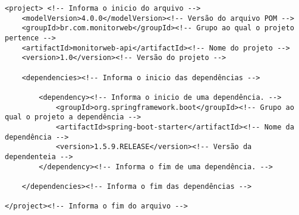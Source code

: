 

\begin{lstlisting}[style=XML,label=Func:ExemploPom,caption={[Exemplo de um arquiv POM.xml.]Exemplo de um arquiv POM.xml.}]
<project> <!-- Informa o inicio do arquivo -->
	<modelVersion>4.0.0</modelVersion><!-- Versão do arquivo POM -->
	<groupId>br.com.monitorweb</groupId><!-- Grupo ao qual o projeto pertence -->
	<artifactId>monitorweb-api</artifactId><!-- Nome do projeto -->
	<version>1.0</version><!-- Versão do projeto -->
	
	<dependencies><!-- Informa o inicio das dependências -->
  
		<dependency><!-- Informa o inicio de uma dependência. -->
			<groupId>org.springframework.boot</groupId><!-- Grupo ao qual o projeto a dependência -->
			<artifactId>spring-boot-starter</artifactId><!-- Nome da dependência -->
			<version>1.5.9.RELEASE</version><!-- Versão da dependenteia -->
		</dependency><!-- Informa o fim de uma dependência. -->
	
	</dependencies><!-- Informa o fim das dependências -->
	
</project><!-- Informa o fim do arquivo -->
\end{lstlisting}


